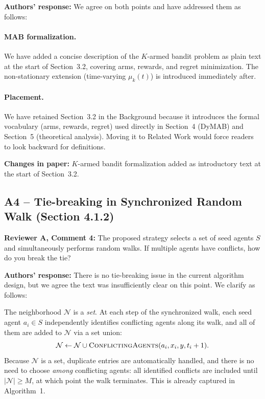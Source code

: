 \documentclass[review]{jair}
\begin{document}
\begin{authorbox}
\textbf{Authors' response:} We agree on both points and have addressed them as follows:

\paragraph{MAB formalization.} We have added a concise description of the $K$-armed bandit problem as plain text at the start of Section~3.2, covering arms, rewards, and regret minimization. The non-stationary extension (time-varying $\mu_k(t)$) is introduced immediately after.

\paragraph{Placement.} We have retained Section~3.2 in the Background because it introduces the formal vocabulary (arms, rewards, regret) used directly in Section~4 (DyMAB) and Section~5 (theoretical analysis). Moving it to Related Work would force readers to look backward for definitions.
\end{authorbox}

\begin{changebox}
\textbf{Changes in paper:} $K$-armed bandit formalization added as introductory text at the start of Section~3.2.
\end{changebox}

\subsection*{A4 -- Tie-breaking in Synchronized Random Walk (Section 4.1.2)}

\begin{reviewerbox}
\textbf{Reviewer A, Comment 4:} The proposed strategy selects a set of seed agents $S$ and simultaneously performs random walks. If multiple agents have conflicts, how do you break the tie?
\end{reviewerbox}

\begin{authorbox}
\textbf{Authors' response:} There is no tie-breaking issue in the current algorithm design, but we agree the text was insufficiently clear on this point. We clarify as follows:

The neighborhood $\mathcal{N}$ is a \emph{set}. At each step of the synchronized walk, each seed agent $a_i \in S$ independently identifies conflicting agents along its walk, and all of them are added to $\mathcal{N}$ via a set union:
\[
\mathcal{N} \leftarrow \mathcal{N} \cup \textsc{ConflictingAgents}(a_i, x_i, y, t_i + 1).
\]
Because $\mathcal{N}$ is a set, duplicate entries are automatically handled, and there is no need to choose \emph{among} conflicting agents: all identified conflicts are included until $|\mathcal{N}| \geq M$, at which point the walk terminates. This is already captured in Algorithm~1.
\end{authorbox}
\end{document}
